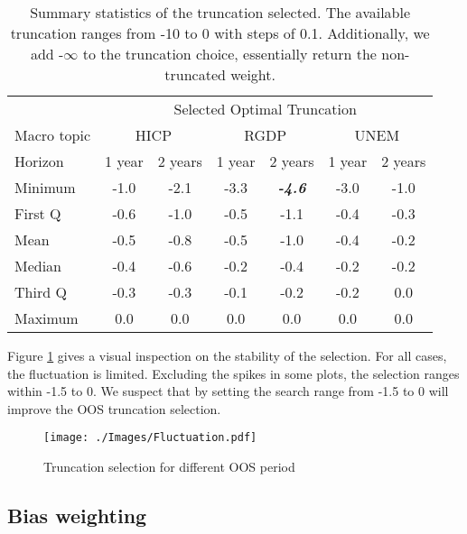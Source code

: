 \documentclass[11pt]{article}
\begin{document}
\begin{table}[!h]
	\centering
	\caption{Summary statistics of the truncation selected. The available truncation ranges from -10 to 0 with steps of 0.1. Additionally, we add -$\infty$ to the truncation choice, essentially return the non-truncated weight.}
	\label{tab: truncation summary statistics}
	\begin{tabular}{lcccccc}%
		\hline
		&\multicolumn{6}{c}{Selected Optimal Truncation}\\
		\cmidrule(lr){2-7}
		Macro topic & \multicolumn{2}{c}{HICP} & \multicolumn{2}{c}{RGDP} & \multicolumn{2}{c}{UNEM} \\
		\cmidrule(lr){2-3} \cmidrule(lr){4-5}\cmidrule(lr){6-7}
		Horizon     & 1 year & 2 years & 1 year & 2 years & 1 year & 2 years \\ 
		\hline
		Minimum     & -1.0        & -2.1        & -3.3        & \textbf{\emph{-4.6}}        & -3.0        & -1.0        \\
		First Q     & -0.6        & -1.0        & -0.5        & -1.1        & -0.4        & -0.3        \\
		Mean        & -0.5        & -0.8        & -0.5        & -1.0        & -0.4        & -0.2        \\
		Median      & -0.4        & -0.6        & -0.2        & -0.4        & -0.2        & -0.2        \\
		Third Q     & -0.3        & -0.3        & -0.1        & -0.2        & -0.2        & 0.0         \\
		Maximum     & 0.0         & 0.0         & 0.0         & 0.0         & 0.0         & 0.0         \\ 
		\hline
	\end{tabular}
\end{table}

Figure \ref{fig: fluctuation} gives a visual inspection on the stability of the selection. For all cases, the fluctuation is limited. Excluding the spikes in some plots, the selection ranges within -1.5 to 0. We suspect that by setting the search range from -1.5 to 0 will improve the OOS truncation selection. 

\begin{figure}[!h]
	\centering
	\texttt{[image: ./Images/Fluctuation.pdf]}
	\caption{Truncation selection for different OOS period}\label{fig: fluctuation}
\end{figure}

\subsection{Bias weighting}\label{bias-weighting}
\end{document}
